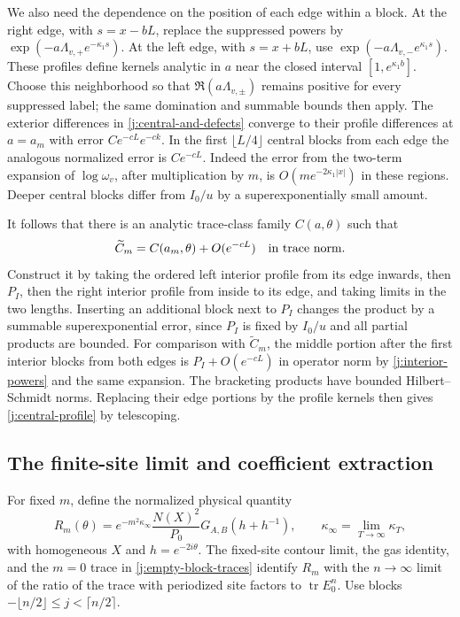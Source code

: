 We also need the dependence on the position of each edge within a block.
At the right edge, with $s=x-bL$, replace the suppressed powers by
$\exp(-a\Lambda_{v,+}e^{-\kappa_1s})$. At the left edge, with $s=x+bL$,
use $\exp(-a\Lambda_{v,-}e^{\kappa_1s})$. These profiles define kernels
analytic in $a$ near the closed interval $[1,e^{\kappa_1b}]$. Choose this
neighborhood so that $\Re(a\Lambda_{v,\pm})$ remains positive for every
suppressed label; the same domination and summable bounds then apply.
The exterior differences in
\eqref{j:central-and-defects} converge to their profile differences at
$a=a_m$ with error $Ce^{-cL}e^{-ck}$. In the first
$\lfloor L/4\rfloor$ central blocks from each edge the analogous
normalized error is $Ce^{-cL}$. Indeed the error from the two-term
expansion of $\log\omega_v$, after multiplication by $m$, is
$O(me^{-2\kappa_1|x|})$ in these regions. Deeper central blocks differ
from $I_0/u$ by a superexponentially small amount.

It follows that there is an analytic trace-class family $C(a,\theta)$
such that
\begin{equation}\label{j:central-profile}
 \widetilde C_m=C(a_m,\theta)+O(e^{-cL})
 \quad\hbox{in trace norm}.
\end{equation}
Construct it by taking the ordered left interior profile from its edge
inwards, then $P_I$, then the right interior profile from inside to its
edge, and taking limits in the two lengths. Inserting an additional block
next to $P_I$ changes the product by a summable superexponential error,
since $P_I$ is fixed by $I_0/u$ and all partial products are bounded.
For comparison with $\widetilde C_m$, the middle portion after the first
interior blocks from both edges is $P_I+O(e^{-cL})$ in operator norm by
\eqref{j:interior-powers} and the same expansion. The bracketing products
have bounded Hilbert--Schmidt norms. Replacing their edge portions by the
profile kernels then gives \eqref{j:central-profile} by telescoping.

\subsection{The finite-site limit and coefficient extraction}

For fixed $m$, define the normalized physical quantity
\begin{equation}\label{j:normalized-cylinder}
 R_m(\theta)=e^{-m^2\kappa_\infty}\frac{N(X)^2}{P_0}
             G_{A,B}(h+h^{-1}),\qquad
 \kappa_\infty=\lim_{T\to\infty}\kappa_T,
\end{equation}
with homogeneous $X$ and $h=e^{-2i\theta}$. The fixed-site contour limit,
the gas identity, and the $m=0$ trace in \eqref{j:empty-block-traces}
identify $R_m$ with the $n\to\infty$ limit of the ratio of the trace with
periodized site factors to $\operatorname{tr}E_0^n$. Use blocks
$-\lfloor n/2\rfloor\le j<\lceil n/2\rceil$.

